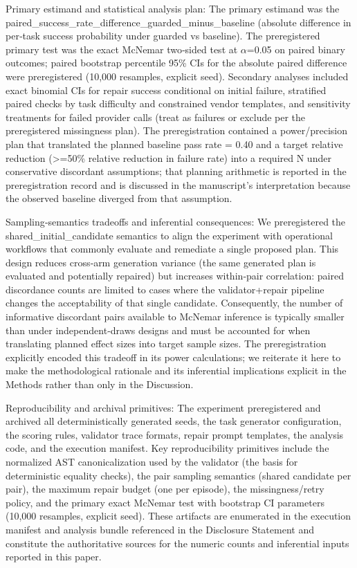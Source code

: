 \documentclass[conference]{IEEEtran}
\begin{document}
Primary estimand and statistical analysis plan: The primary estimand was the paired\_success\_rate\_difference\_guarded\_minus\_baseline (absolute difference in per‑task success probability under guarded vs baseline). The preregistered primary test was the exact McNemar two‑sided test at \ensuremath{\alpha}=0.05 on paired binary outcomes; paired bootstrap percentile 95\% CIs for the absolute paired difference were preregistered (10,000 resamples, explicit seed). Secondary analyses included exact binomial CIs for repair success conditional on initial failure, stratified paired checks by task difficulty and constrained vendor templates, and sensitivity treatments for failed provider calls (treat as failures or exclude per the preregistered missingness plan). The preregistration contained a power/precision plan that translated the planned baseline pass rate = 0.40 and a target relative reduction (>=50\% relative reduction in failure rate) into a required N under conservative discordant assumptions; that planning arithmetic is reported in the preregistration record and is discussed in the manuscript's interpretation because the observed baseline diverged from that assumption.

Sampling‑semantics tradeoffs and inferential consequences: We preregistered the shared\_initial\_candidate semantics to align the experiment with operational workflows that commonly evaluate and remediate a single proposed plan. This design reduces cross‑arm generation variance (the same generated plan is evaluated and potentially repaired) but increases within‑pair correlation: paired discordance counts are limited to cases where the validator+repair pipeline changes the acceptability of that single candidate. Consequently, the number of informative discordant pairs available to McNemar inference is typically smaller than under independent‑draws designs and must be accounted for when translating planned effect sizes into target sample sizes. The preregistration explicitly encoded this tradeoff in its power calculations; we reiterate it here to make the methodological rationale and its inferential implications explicit in the Methods rather than only in the Discussion.

Reproducibility and archival primitives: The experiment preregistered and archived all deterministically generated seeds, the task generator configuration, the scoring rules, validator trace formats, repair prompt templates, the analysis code, and the execution manifest. Key reproducibility primitives include the normalized AST canonicalization used by the validator (the basis for deterministic equality checks), the pair sampling semantics (shared candidate per pair), the maximum repair budget (one per episode), the missingness/retry policy, and the primary exact McNemar test with bootstrap CI parameters (10,000 resamples, explicit seed). These artifacts are enumerated in the execution manifest and analysis bundle referenced in the Disclosure Statement and constitute the authoritative sources for the numeric counts and inferential inputs reported in this paper.
\end{document}
